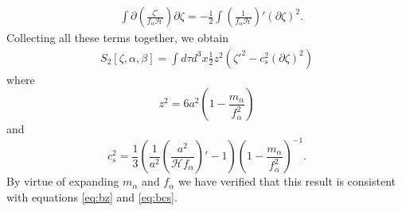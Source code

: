 \documentclass[12pt,a4paper]{article}
\numberwithin{equation}{section}
\numberwithin{equation}{section}
\begin{document}
\begin{equation}
    \begin{split}
    & \int  \partial \left(\frac{\zeta'}{f_{\alpha} \mathcal{H}} \right) \partial \zeta = -\frac{1}{2}\int \left(\frac{1}{f_{\alpha} \mathcal{H}} \right)' (\partial \zeta)^2.
    \end{split}
\end{equation}
Collecting all these terms together, we obtain
\begin{equation}
\begin{split}
    S_{2}[\zeta,\alpha,\beta] = \int d\tau d^3x  \frac{1}{2} z^2 \left(\zeta'^2-c_s^2(\partial\zeta)^2 \right)
    \end{split}
\end{equation}
where 
\begin{equation}
    z^2 =  6 a^2 \left(1-\frac{m_{\alpha}}{f_{\alpha}^2} \right) 
\end{equation}
and 
\begin{equation}
    c_s^2 =\frac{1}{3}  \left(\frac{1}{a^2}\left(\frac{a^2}{\mathcal{H} f_{\alpha}}\right)'-1 \right) \left(1-\frac{m_{\alpha}}{f_{\alpha}^2} \right)^{-1} .
\end{equation}
By virtue of expanding $m_{\alpha}$ and $f_{\alpha}$ we have verified that this result is consistent with equations \eqref{eq:bz} and \eqref{eq:bcs}.
\end{document}
